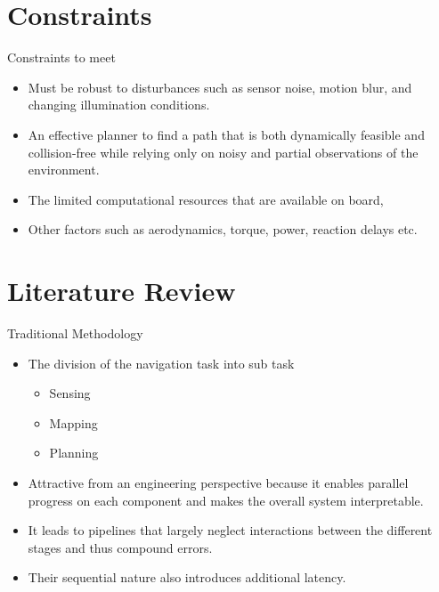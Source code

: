 \documentclass{beamer}
\begin{document}
\section{Constraints}
\begin{frame}{Constraints to meet}
	\begin{itemize}
		\item Must be robust to disturbances such as sensor noise, motion blur, and changing illumination conditions.
		\item An effective planner to find a path that is both dynamically feasible and collision-free while relying only on noisy and partial observations of the environment.
		\item The limited computational resources that are available on board, 
		\item Other factors such as aerodynamics, torque, power, reaction delays etc.
	\end{itemize}
\end{frame}


\section{Literature Review}

\begin{frame}{Traditional Methodology}
	\begin{itemize}
		\item The division of the navigation task into sub task
		\begin{itemize}
			\item Sensing
			\item Mapping
			\item Planning	
		\end{itemize} 
	
		\item Attractive from an engineering perspective because it enables parallel progress on each component and makes the overall system interpretable. 
		\item It leads to pipelines that largely neglect interactions between the different stages and thus compound errors. 
		\item Their sequential nature also introduces additional latency.
	\end{itemize}
\end{frame}
\end{document}
